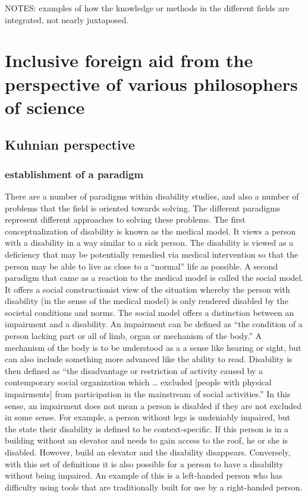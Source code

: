 \documentclass{lps}
\begin{document}
NOTES:
examples of how the knowledge or methods in the different fields are integrated, not nearly juxtaposed.
\section{Inclusive foreign aid from the perspective of various philosophers of
science}
\subsection{Kuhnian perspective}
\subsubsection{establishment of a paradigm}

There are a number of paradigms within disability studies, and also a number of problems that the field is oriented towards solving. The different paradigms represent different approaches to solving these problems. The first conceptualization of disability is known as the medical model. It views a person with a disability in a way similar to a sick person. The disability is viewed as a deficiency that may be potentially remedied via medical intervention so that the person may be able to live as close to a “normal” life as possible. 
A second paradigm that came as a reaction to the medical model is called the social model. It offers a social constructionist view of the situation whereby the person with disability (in the sense of the medical model) is only rendered  disabled by the societal conditions and norms. The social model offers a distinction between an impairment and a disability. An impairment can be defined as “the condition of a person lacking part or all of limb, organ or mechanism of the body.” A mechanism of the body is to be understood as a a sense like hearing or sight, but can also include something more advanced like the ability to read. Disability is then defined as “the disadvantage or restriction of activity caused by a contemporary social organization which … excluded [people with physical impairments] from participation in the mainstream of social activities.” In this sense, an impairment does not mean a person is disabled if they are not excluded in some sense. For example, a person without legs is undeniably impaired, but the state their disability is defined to be context-specific. If this person is in a building without an elevator and needs to gain access to the roof, he or she is disabled. However, build an elevator and the disability disappears. Conversely, with this set of definitions it is also possible for a person to have a disability without being impaired. An example of this is a left-handed person who has difficulty using tools that are traditionally built for use by a right-handed person.
\end{document}
